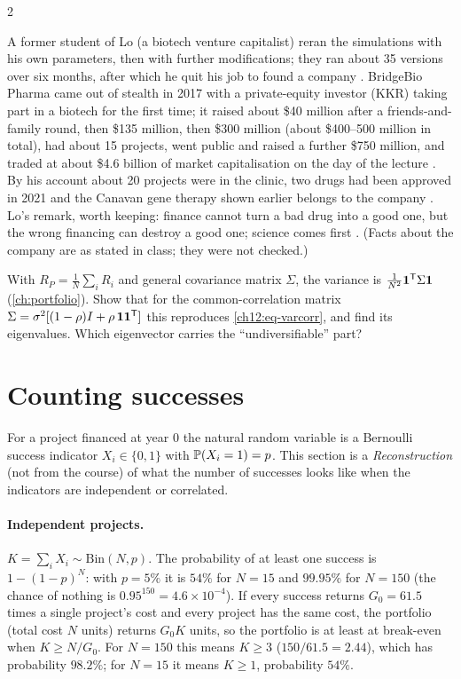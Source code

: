 \begin{paracol}{2}
\begin{finance}\label{ch12:fin-bridge}
A former student of Lo (a biotech venture capitalist) reran the simulations with his own parameters,
then with further modifications; they ran about 35 versions over six months, after which he quit his job to
found a company . BridgeBio Pharma came out of stealth in 2017 with a private-equity investor
(KKR) taking part in a biotech for the first time; it raised about \$40 million after a friends-and-family round,
then \$135 million, then \$300 million (about \$400--500 million in total), had about 15 projects, went public and raised a further
\$750 million, and traded at about \$4.6 billion of market capitalisation on the day of the lecture
. By his account about 20 projects were in the clinic, two drugs had been approved in 2021
and the Canavan gene therapy shown earlier belongs to the company . Lo's remark, worth
keeping: finance cannot turn a bad drug into a good one, but the wrong financing can destroy a good one; science
comes first . (Facts about the company are as stated in class; they were not checked.)
\end{finance}

\begin{exercise}
With $R_P=\frac1N\sum_iR_i$ and general covariance matrix $\Sigma$, the variance is $\frac{1}{N^2}\mathbf 1^{\mathsf T}\Sigma\mathbf 1$
(\cref{ch:portfolio}). Show that for the common-correlation matrix $\Sigma=\sigma^2[(1-\rho)I+\rho\,\mathbf 1\mathbf 1^{\mathsf T}]$ this reproduces
\eqref{ch12:eq-varcorr}, and find its eigenvalues. Which eigenvector carries the ``undiversifiable'' part?
\end{exercise}

\section{Counting successes}\label{ch12:sec-counts}

For a project financed at year 0 the natural random variable is a Bernoulli success indicator
$X_i\in\{0,1\}$ with $\mathbb{P}(X_i=1)=p$. This section is a \emph{Reconstruction} (not from the course) of what
the number of successes looks like when the indicators are independent or correlated.

\paragraph{Independent projects.}
$K=\sum_iX_i\sim\mathrm{Bin}(N,p)$. The probability of at least one success is $1-(1-p)^N$: with $p=5\%$ it is
$54\%$ for $N=15$ and $99.95\%$ for $N=150$ (the chance of nothing is $0.95^{150}=4.6\times10^{-4}$). If every success returns
$G_0=61.5$ times a single project's cost and every project has the same cost, the portfolio (total cost $N$ units) returns
$G_0K$ units, so the portfolio is at least at break-even when $K\ge N/G_0$. For $N=150$ this means $K\ge3$
($150/61.5=2.44$), which has probability $98.2\%$; for $N=15$ it means $K\ge1$, probability $54\%$.


\end{paracol}
